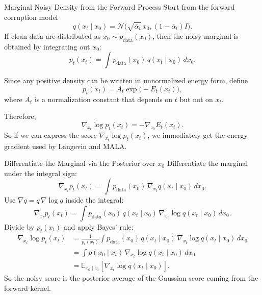 \documentclass[aspectratio=169,11pt]{beamer}
\begin{document}
 
 \begin{frame}{Marginal Noisy Density from the Forward Process}
 \small
 Start from the forward corruption model
 \[
 q(x_t\mid x_0)=\mathcal{N}\!\bigl(\sqrt{\bar\alpha_t}\,x_0,(1-\bar\alpha_t)I\bigr).
 \]
 If clean data are distributed as $x_0\sim p_{\mathrm{data}}(x_0)$, then the noisy marginal is obtained by integrating out $x_0$:
 \[
 p_t(x_t)=\int p_{\mathrm{data}}(x_0)\,q(x_t\mid x_0)\,dx_0.
 \]

 \medskip
 Since any positive density can be written in unnormalized energy form, define
 \[
 p_t(x_t)=A_t\exp\!\bigl(-E_t(x_t)\bigr),
 \]
 where $A_t$ is a normalization constant that depends on $t$ but not on $x_t$.

 \medskip
 Therefore,
 \[
 \nabla_{x_t}\log p_t(x_t)=-\nabla_{x_t}E_t(x_t).
 \]
 So if we can express the score $\nabla_{x_t}\log p_t(x_t)$, we immediately get the energy gradient used by Langevin and MALA.
 \end{frame}

 \begin{frame}{Differentiate the Marginal via the Posterior over $x_0$}
 \small
 Differentiate the marginal under the integral sign:
 \[
 \nabla_{x_t}p_t(x_t)
 = \int p_{\mathrm{data}}(x_0)\,\nabla_{x_t}q(x_t\mid x_0)\,dx_0.
 \]
 Use $\nabla q = q\,\nabla \log q$ inside the integral:
 \[
 \nabla_{x_t}p_t(x_t)
 = \int p_{\mathrm{data}}(x_0)\,q(x_t\mid x_0)\,\nabla_{x_t}\log q(x_t\mid x_0)\,dx_0.
 \]
 Divide by $p_t(x_t)$ and apply Bayes' rule:
 \[
 \begin{aligned}
 \nabla_{x_t}\log p_t(x_t)
 &= \frac{1}{p_t(x_t)}\int p_{\mathrm{data}}(x_0)\,q(x_t\mid x_0)\,\nabla_{x_t}\log q(x_t\mid x_0)\,dx_0 \\
 &= \int p(x_0\mid x_t)\,\nabla_{x_t}\log q(x_t\mid x_0)\,dx_0 \\
 &= \mathbb{E}_{x_0\mid x_t}\!\left[\nabla_{x_t}\log q(x_t\mid x_0)\right].
 \end{aligned}
 \]
 So the noisy score is the posterior average of the Gaussian score coming from the forward kernel.
 \end{frame}
\end{document}
